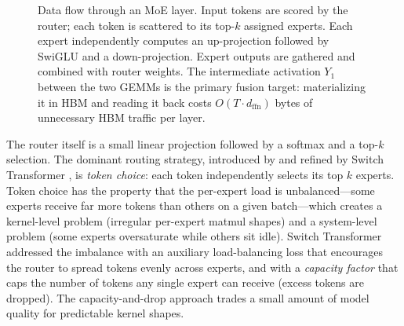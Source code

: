 \documentclass[10pt]{article}
\begin{document}
\begin{figure}[t]
\caption{Data flow through an MoE layer. Input tokens are scored by the router; each token is scattered to its top-$k$ assigned experts. Each expert independently computes an up-projection followed by SwiGLU and a down-projection. Expert outputs are gathered and combined with router weights. The intermediate activation $Y_1$ between the two GEMMs is the primary fusion target: materializing it in HBM and reading it back costs $O(T \cdot d_\text{ffn})$ bytes of unnecessary HBM traffic per layer.}
\label{fig:moe-dataflow}
\end{figure}

The router itself is a small linear projection followed by a softmax and a top-$k$ selection. The dominant routing strategy, introduced by \citet{shazeer2017outrageously} and refined by Switch Transformer \citep{fedus2022switch}, is \emph{token choice}: each token independently selects its top $k$ experts. Token choice has the property that the per-expert load is unbalanced---some experts receive far more tokens than others on a given batch---which creates a kernel-level problem (irregular per-expert matmul shapes) and a system-level problem (some experts oversaturate while others sit idle). Switch Transformer addressed the imbalance with an auxiliary load-balancing loss that encourages the router to spread tokens evenly across experts, and with a \emph{capacity factor} that caps the number of tokens any single expert can receive (excess tokens are dropped). The capacity-and-drop approach trades a small amount of model quality for predictable kernel shapes.
\end{document}
